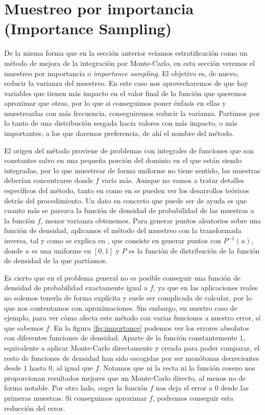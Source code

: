 \documentclass{scrbook}
\begin{document}
\section{Muestreo por importancia (Importance Sampling)}
De la misma forma que en la sección anterior veíamos estratificación como un método de mejora de la integración por Monte-Carlo, en esta sección veremos el muestreo por importancia o \textit{importance sampling}. El objetivo es, de nuevo, reducir la varianza del muestreo. En este caso nos aprovecharemos de que hay variables que tienen más impacto en el valor final de la función que queremos aproximar que otras, por lo que si conseguimos poner énfasis en ellas y muestrearlas con más frecuencia, conseguiremos reducir la varianza. Partimos por lo tanto de una distribución sesgada hacia valores con más impacto, o más importantes, a los que daremos preferencia, de ahí el nombre del método.

El origen del método proviene de problemas con integrales de funciones que son constantes salvo en una pequeña porción del dominio en el que están siendo integradas, por lo que muestrear de forma uniforme no tiene sentido, las muestras deberían concentrarse donde $f$ varía más. Aunque no vamos a tratar detalles específicos del método, tanto en \cite{RestOfYourLife} como en \cite{owen} se pueden ver los desarrollos teóricos detrás del procedimiento. Un dato en concreto que puede ser de ayuda es que cuanto más se parezca la función de densidad de probabilidad de las muestras a la función $f$, menor varianza obtenemos. Para generar puntos aleatorios sobre una función de densidad, aplicamos el método del muestreo con la transformada inversa, tal y como se explica en \cite{RestOfYourLife}, que consiste en generar puntos con $P^{-1}(u)$, donde $u$ es una uniforme en $[0,1]$ y $P$ es la función de distribución de la función de densidad de la que partíamos. 

Es cierto que en el problema general no es posible conseguir una función de densidad de probabilidad exactamente igual a $f$, ya que en las aplicaciones reales no solemos tenerla de forma explícita y suele ser complicada de calcular, por lo que nos contentamos con aproximaciones. Sin embargo, en nuestro caso de ejemplo, para ver cómo afecta este método con varias funciones a nuestro error, sí que sabemos $f$. En la figura \ref{fig:importance} podemos ver los errores absolutos con diferentes funciones de densidad. Aparte de la función constantemente $1$, equivalente a aplicar Monte-Carlo directamente y creada para poder comparar, el resto de funciones de densidad han sido escogidas por ser monótonas decrecientes desde $1$ hasta $0$, al igual que $f$. Notamos que ni la recta ni la función coseno nos proporcionan resultados mejores que un Monte-Carlo directo, al menos no de forma notable. Por otro lado, coger la función $f$ nos deja el error a $0$ desde las primeras muestras. Si conseguimos aproximar $f$, podremos conseguir esta reducción del error.
\end{document}
